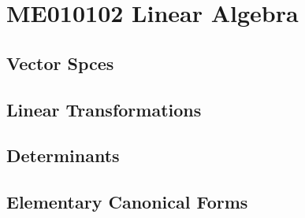 

\part{ME010102 Linear Algebra}
\chapter{Vector Spces}
\chapter{Linear Transformations}
\chapter{Determinants}
\chapter{Elementary Canonical Forms}
